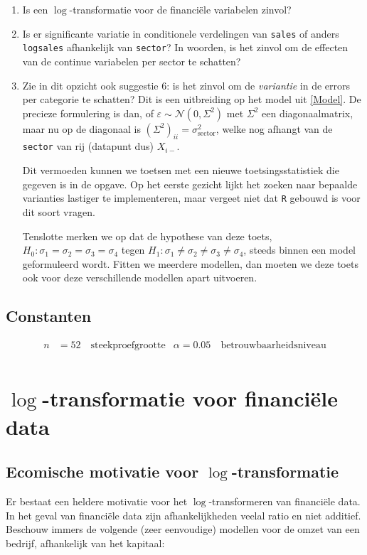 \documentclass[a4paper]{report}
\begin{document}
  \begin{enumerate}
  \item Is een $\log$-transformatie voor de financi\"ele variabelen zinvol?
  
  \item Is er significante variatie in conditionele verdelingen van \verb!sales! of anders \verb!logsales! afhankelijk van \verb!sector!? In woorden, is het zinvol om de effecten van de continue variabelen per sector te schatten?
  
  \item Zie in dit opzicht ook suggestie 6: is het zinvol om de \emph{variantie} in de errors per categorie te schatten? Dit is een uitbreiding op het model uit \ref{Model}. De precieze formulering is dan, of $\varepsilon \sim \mathcal{N}(0,\Sigma^2)$ met $\Sigma^2$ een diagonaalmatrix, maar nu op de diagonaal is $(\Sigma^2)_{ii} = \sigma^2_{\text{sector}}$, welke nog afhangt van de \verb!sector! van rij (datapunt dus) $X_{i-}$. 
  
  Dit vermoeden kunnen we toetsen met een nieuwe toetsingsstatistiek die gegeven is in de opgave. Op het eerste gezicht lijkt het zoeken naar bepaalde varianties lastiger te implementeren, maar vergeet niet dat \verb!R! gebouwd is voor dit soort vragen.
  
  Tenslotte merken we op dat de hypothese van deze toets, $H_0:\sigma_1=\sigma_2=\sigma_3=\sigma_4$ tegen $H_1: \sigma_1
  \neq \sigma_2 \neq \sigma_3 \neq \sigma_4$, steeds binnen een model geformuleerd wordt. Fitten we meerdere modellen, dan moeten we deze toets ook voor deze verschillende modellen apart uitvoeren.
  \end{enumerate}
  
\section{Constanten}
\label{constanten}

\begin{align*}
n &= 52 \quad \text{steekproefgrootte} & \alpha = 0.05 \quad \text{betrouwbaarheidsniveau} \\
\end{align*}
  
\chapter{$\log$-transformatie voor financi\"ele data}
\section{Ecomische motivatie voor $\log$-transformatie}
\label{economische motivatie}
  Er bestaat een heldere motivatie voor het $\log$-transformeren van financi\"ele data. In het geval van financi\"ele data zijn afhankelijkheden veelal ratio en niet additief. Beschouw immers de volgende (zeer eenvoudige) modellen voor de omzet van een bedrijf, afhankelijk van het kapitaal:
\end{document}
